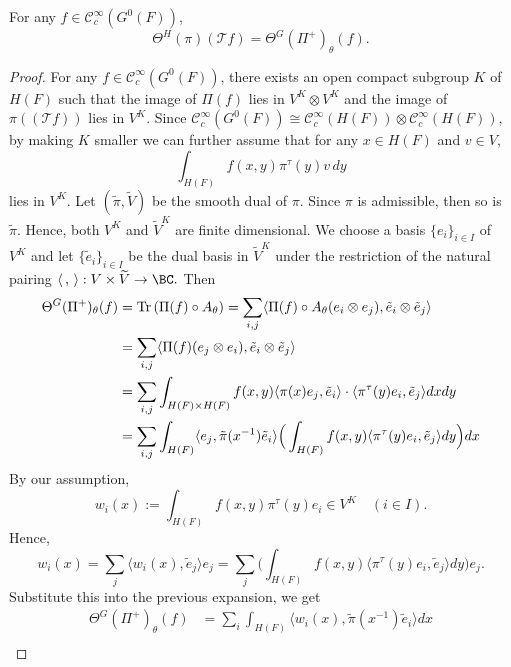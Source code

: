 \documentclass[11pt,letterpaper]{amsart}
\numberwithin{equation}{section}
\begin{document}
\begin{lemma}
\label{lemma: distribution relation p-adic}
For any $f \in \mathcal{C}^{\infty}_{c}(G^0(F))$, 
\[
\Theta^{H}(\pi)(\mathcal{T}f) = \Theta^{G}(\Pi^{+})_{\theta}(f).
\]
\end{lemma}

\begin{proof}
For any $f \in \mathcal{C}^{\infty}_{c}(G^0(F))$, there exists an open compact subgroup $K$ of $H(F)$ such that the image of $\Pi(f)$ lies in $V^{K} \otimes V^{K}$ and the image of $\pi((\mathcal{T}f))$ lies in $V^{K}$. Since $\mathcal{C}^{\infty}_{c}(G^0(F)) \cong \mathcal{C}^{\infty}_{c}(H(F)) \otimes \mathcal{C}^{\infty}_{c}(H(F))$, by making $K$ smaller we can further assume that for any $x \in H(F)$ and $v \in V$,
\[
\int_{H(F)} f(x, y)\pi^{\tau}(y)v \, dy
\]
lies in $V^{K}$. Let $(\tilde{\pi}, \widetilde{V})$ be the smooth dual of $\pi$. Since $\pi$ is admissible, then so is $\tilde{\pi}$. Hence, both $V^{K}$ and $\widetilde{V}^{K}$ are finite dimensional. We choose a basis $\{e_i\}_{i \in I}$ of $V^{K}$ and let $\{\tilde{e}_i\}_{i \in I}$ be the dual basis in $\widetilde{V}^{K}$ under the restriction of the natural pairing
$
\langle \, ,  \, \rangle : V \times \widetilde{V} \rightarrow \BC.
$
Then
\begin{align*}
\Theta^{G}(\Pi^{+})_{\theta}(f) & = {\rm Tr} \, (\Pi(f) \circ A_{\theta}) = \sum_{i, j} \langle \Pi(f) \circ A_{\theta} (e_i \otimes e_j), \tilde{e}_i \otimes \tilde{e}_j \rangle \\
& = \sum_{i, j} \langle \Pi(f) (e_j \otimes e_i), \tilde{e}_i \otimes \tilde{e}_j \rangle \\
& = \sum_{i, j} \int_{H(F) \times H(F)} f(x, y) \langle \pi(x)e_{j}, \tilde{e}_i \rangle \cdot \langle \pi^{\tau}(y) e_{i}, \tilde{e}_j \rangle dxdy \\
& = \sum_{i, j} \int_{H(F)}  \langle e_{j}, \tilde{\pi}(x^{-1})\tilde{e}_i \rangle \Big( \int_{H(F)}f(x,y)\langle \pi^{\tau}(y) e_{i}, \tilde{e}_j \rangle dy \Big)dx
\end{align*}
By our assumption, 
\[
w_i(x) := \int_{H(F)} f(x,y)\pi^{\tau}(y)e_i \in V^{K} \quad (i \in I).
\]
Hence,
\[
w_i(x) = \sum_{j} \langle w_i(x), \tilde{e}_j \rangle e_j = \sum_{j} \Big(\int_{H(F)} f(x,y) \langle \pi^{\tau}(y)e_i, \tilde{e}_j \rangle dy\Big) e_j.
\]
Substitute this into the previous expansion, we get
\begin{align*}
\Theta^{G}(\Pi^{+})_{\theta}(f) & = \sum_{i} \int_{H(F)} \langle w_i(x), \tilde{\pi}(x^{-1})\tilde{e}_i \rangle dx \\

\end{align*}
\end{proof}
\end{document}
